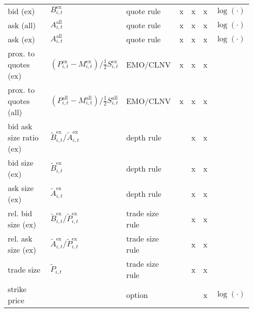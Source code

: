 \begin{threeparttable}
\begin{tabular}{@{}lllllll@{}}
        bid (ex)                & $B_{i, t}^{\text{ex}}$                                                                           & quote rule           & x    & x    & x    & $\log(\cdot)$ \\
        ask (all)               & $A_{i, t}^{\text{all}}$                                                                          & quote rule           & x    & x    & x    & $\log(\cdot)$ \\
        ask (ex)                & $A_{i, t}^{\text{all}}$                                                                          & quote rule           & x    & x    & x    & $\log(\cdot)$ \\
        prox. to quotes (ex)    & $\left(P_{i, t}^{\text{ex}}- M_{i, t}^{\text{ex}}\right) / \tfrac{1}{2} S_{i, t}^{\text{ex}}$    & \gls{EMO}/\gls{CLNV} & x    & x    & x    &               \\
        prox. to quotes (all)   & $\left(P_{i, t}^{\text{all}}- M_{i, t}^{\text{all}}\right) / \tfrac{1}{2} S_{i, t}^{\text{all}}$ & \gls{EMO}/\gls{CLNV} & x    & x    & x    &               \\
        bid ask size ratio (ex) & $\tilde{B}_{i, t}^{\text{ex}}/\tilde{A}_{i, t}^{\text{ex}}$                                      & depth rule           &      & x    & x    &               \\
        bid size (ex)           & $\tilde{B}_{i, t}^{\text{ex}}$                                                                   & depth rule           &      & x    & x    &               \\
        ask size (ex)           & $\tilde{A}_{i, t}^{\text{ex}}$                                                                   & depth rule           &      & x    & x    &               \\
        rel. bid size (ex)      & $\tilde{B}_{i, t}^{\text{ex}}/\tilde{P}_{i, t}^{\text{ex}}$                                      & trade size rule      &      & x    & x    &               \\
        rel. ask size (ex)      & $\tilde{A}_{i, t}^{\text{ex}}/\tilde{P}_{i, t}^{\text{ex}}$                                      & trade size rule      &      & x    & x    &               \\
        trade size              & $\tilde{P}_{i, t}$                                                                               & trade size rule      &      & x    & x    &               \\
        strike price            &                                                                                                  & option               &      &      & x    & $\log(\cdot)$ \\

\end{tabular}
\end{threeparttable}

